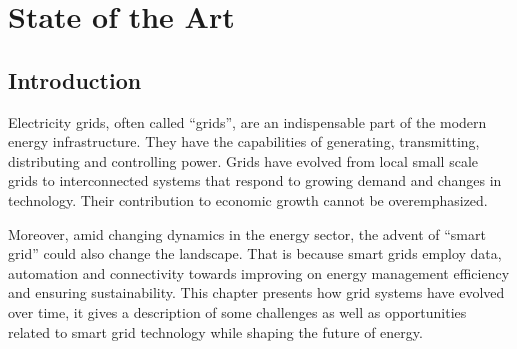 \chapter{State of the Art} \label{chap:state_of_the_art}


\section*{Introduction}
Electricity grids, often called “grids”, are an indispensable part of the modern energy infrastructure. They have the capabilities of generating, transmitting, distributing and controlling power. Grids have evolved from local small scale grids to interconnected systems that respond to growing demand and changes in technology. Their contribution to economic growth cannot be overemphasized.

Moreover, amid changing dynamics in the energy sector, the advent of “smart grid” could also change the landscape. That is because smart grids employ data, automation and connectivity towards improving on energy management efficiency and ensuring sustainability. This chapter presents how grid systems have evolved over time, it gives a description of some challenges as well as opportunities related to smart grid technology while shaping the future of energy.



\newpage

